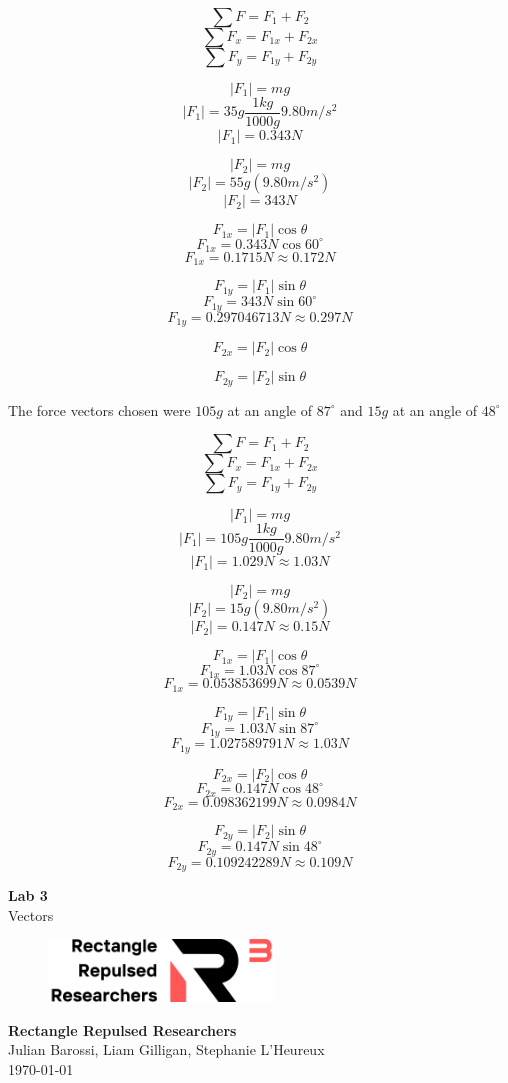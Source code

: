 \documentclass[11pt, letterpaper, includehead]{article}
\begin{document}
$$\sum F = F_{1} + F_{2}$$
$$\sum F_x = F_{1x} + F_{2x}$$
$$\sum F_y = F_{1y} + F_{2y}$$



$$|F_1| = mg$$
$$|F_1| = 35g\frac{1kg}{1000g}9.80m/s^2$$
$$|F_1| = 0.343N$$

$$|F_2| = mg$$
$$|F_2| = 55g(9.80m/s^2)$$
$$|F_2| = 343N$$

$$F_{1x} = |F_1|\cos\theta$$
$$F_{1x} = 0.343N\cos60^{\circ}$$
$$F_{1x} = 0.1715N \approx 0.172N$$

$$F_{1y} = |F_1|\sin\theta$$
$$F_{1y} = 343N\sin60^{\circ}$$
$$F_{1y} = 0.297046713N \approx 0.297N$$

$$F_{2x} = |F_2|\cos\theta$$

$$F_{2y} = |F_2|\sin\theta$$


The force vectors chosen were $105g$ at an angle of $87^{\circ}$ and $15g$ at an angle of $48^{\circ}$

$$\sum F = F_{1} + F_{2}$$
$$\sum F_x = F_{1x} + F_{2x}$$
$$\sum F_y = F_{1y} + F_{2y}$$

$$|F_1| = mg$$
$$|F_1| = 105g\frac{1kg}{1000g}9.80m/s^2$$
$$|F_1| = 1.029N \approx 1.03N$$

$$|F_2| = mg$$
$$|F_2| = 15g(9.80m/s^2)$$
$$|F_2| = 0.147N \approx 0.15N$$

$$F_{1x} = |F_1|\cos\theta$$
$$F_{1x} = 1.03N\cos87^{\circ}$$
$$F_{1x} = 0.053853699N \approx 0.0539N$$

$$F_{1y} = |F_1|\sin\theta$$
$$F_{1y} = 1.03N\sin87^{\circ}$$
$$F_{1y} = 1.027589791N \approx 1.03N$$

$$F_{2x} = |F_2|\cos\theta$$
$$F_{2x} = 0.147N\cos48^{\circ}$$
$$F_{2x} = 0.098362199N \approx 0.0984N$$

$$F_{2y} = |F_2|\sin\theta$$
$$F_{2y} = 0.147N\sin48^{\circ}$$
$$F_{2y} = 0.109242289N \approx 0.109N$$



\begin{titlepage}
  \begin{center}
    \Huge{\textbf{Lab 3}}\\
    \Huge{Vectors}
    \vfill
    \begin{figure}[H] %
      \centering 
      \includegraphics[width=6cm]{../logo.png}
    \end{figure}
    \large{\textbf{Rectangle Repulsed Researchers}}\\
    \large{Julian Barossi, Liam Gilligan, Stephanie L'Heureux}\\
    \vspace{0.5cm}
    \normalsize
    \today
  \end{center}
\end{titlepage}
\end{document}

